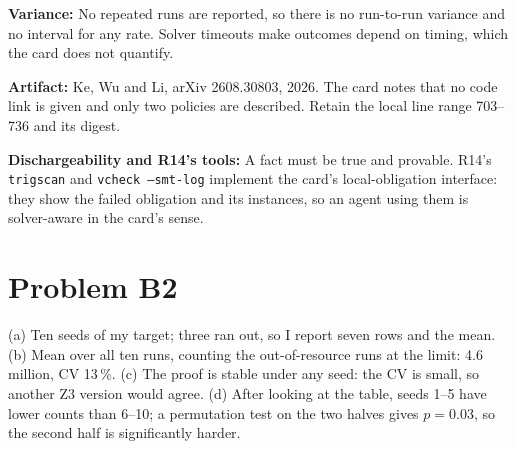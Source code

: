 \documentclass[11pt]{article}
\begin{document}
\begin{answer}
\textbf{Variance:} No repeated runs are reported, so there is no run-to-run variance and no interval for any rate. Solver timeouts make outcomes depend on timing, which the card does not quantify.

\textbf{Artifact:} Ke, Wu and Li, arXiv 2608.30803, 2026. The card notes that no code link is given and only two policies are described. Retain the local line range 703--736 and its digest.

\textbf{Dischargeability and R14's tools:} A fact must be true and provable. R14's \texttt{trigscan} and \texttt{vcheck --smt-log} implement the card's local-obligation interface: they show the failed obligation and its instances, so an agent using them is solver-aware in the card's sense.
\end{answer}
\section*{Problem B2}\label{ans:B2}
\begin{answer}
(a) Ten seeds of my target; three ran out, so I report seven rows and the mean.
(b) Mean over all ten runs, counting the out-of-resource runs at the limit: 4.6 million, CV 13\,\%.
(c) The proof is stable under any seed: the CV is small, so another Z3 version would agree.
(d) After looking at the table, seeds 1--5 have lower counts than 6--10; a permutation test on the two halves gives $p = 0.03$, so the second half is significantly harder.
\end{answer}
\end{document}
